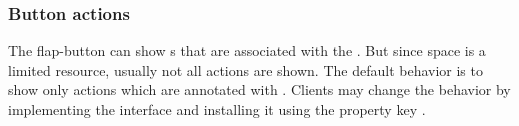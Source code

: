 \subsubsection{Button actions}
The flap-button can show s that are associated with the . But since space is a limited resource, usually not all actions are shown. The default behavior is to show only actions which are annotated with \linebreak {}. Clients may change the behavior by implementing the interface  and installing it using the property key .

